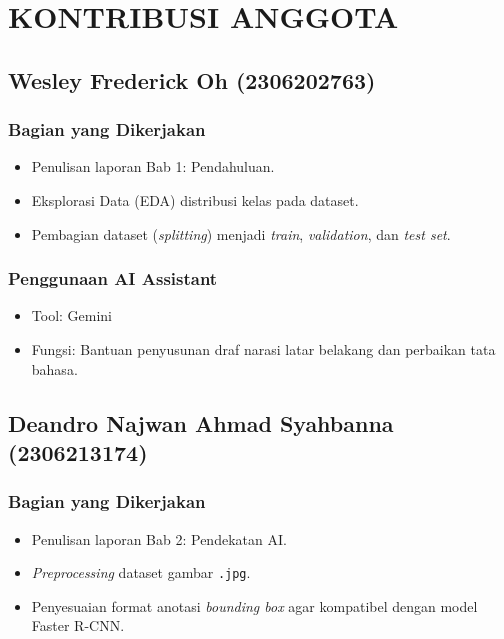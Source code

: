 \documentclass[11pt,a4paper,oneside]{report}
\begin{document}
\chapter{KONTRIBUSI ANGGOTA}

\section{Wesley Frederick Oh (2306202763)}

\subsection*{Bagian yang Dikerjakan}
\begin{itemize}
    \item Penulisan laporan Bab 1: Pendahuluan.
    \item Eksplorasi Data (EDA) distribusi kelas pada dataset.
    \item Pembagian dataset (\textit{splitting}) menjadi \textit{train}, \textit{validation}, dan \textit{test set}.
\end{itemize}

\subsection*{Penggunaan AI Assistant}
\begin{itemize}
    \item Tool: Gemini
    \item Fungsi: Bantuan penyusunan draf narasi latar belakang dan perbaikan tata bahasa.
\end{itemize}

\section{Deandro Najwan Ahmad Syahbanna (2306213174)}

\subsection*{Bagian yang Dikerjakan}
\begin{itemize}
    \item Penulisan laporan Bab 2: Pendekatan AI.
    \item \textit{Preprocessing} dataset gambar \texttt{.jpg}.
    \item Penyesuaian format anotasi \textit{bounding box} agar kompatibel dengan model Faster R-CNN.
\end{itemize}
\end{document}
